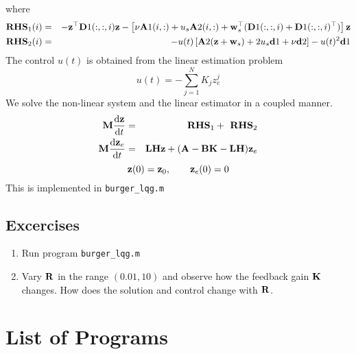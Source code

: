 \documentclass[12pt]{article}
\begin{document}
where 
\begin{eqnarray*}
 \textbf{RHS}_1(i) &=& - {\mathbf z}^\top {\mathbf D}1(:,:,i) {\mathbf z} - \left[ \nu {\mathbf A}1(i,:) + u_s {\mathbf A}2(i,:) + {\mathbf w}_s^\top ({\mathbf D}1(:,:,i) + {\mathbf D}1(:,:,i)^\top) \right] {\mathbf z} \\
 \textbf{RHS}_2(i) &=& - u(t) \left[ {\mathbf A}2 ({\mathbf z} + {\mathbf w}_s) + 2 u_s {\mathbf d}1 +\nu {\mathbf d}2 \right] - u(t)^2 {\mathbf d}1 
\end{eqnarray*}
The control $u(t)$ is obtained from the linear estimation problem
\[
 u(t) = - \sum_{j=1}^N K_j z_e^j
\]
We solve the non-linear system and the linear estimator in a coupled manner.
\begin{eqnarray*}
 {\mathbf M} \frac{\textrm{d} {\mathbf z}}{\textrm{d} t} &=& \textbf{ RHS}_1 + \textbf{ RHS}_2\\
 {\mathbf M} \frac{\textrm{d} {\mathbf z}_e}{\textrm{d} t} &=& {\mathbf L} {\mathbf H} {\mathbf z} + ({\mathbf A} - {\mathbf B} {\mathbf K} - {\mathbf L} {\mathbf H}) {\mathbf z}_e
\end{eqnarray*}
\[
{\mathbf z}(0) = {\mathbf z}_0, \qquad {\mathbf z}_e(0) = 0
\]
This is implemented in {\tt burger\_lqg.m}

\subsection{Excercises}

\begin{enumerate}

\item Run program {\tt burger\_lqg.m}

\item Vary ${\mathbf R}$ in the range $(0.01,10)$ and observe how the feedback gain ${\mathbf K}$ changes. How does the solution and control change with ${\mathbf R}$.

\end{enumerate}

\section{List of Programs}
\end{document}
